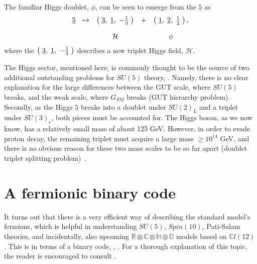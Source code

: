 \documentclass[letterpaper,12pt,titlepage,oneside,final]{book}
\newcommand{\C}{\mathbb{C}}
\newcommand{\RCHO}{\mathbb{R}\otimes\mathbb{C}\otimes\mathbb{H}\otimes\mathbb{O}}
\begin{document}
The familiar Higgs doublet, $\phi$, can be seen to emerge from the $\underline{5}$ as
\begin{equation}\begin{array}{rcccc}
\underline{5} & \mapsto & \left(\hspace{1mm} \underline{3}, \hspace{1mm}\underline{1}, \hspace{1mm}-\frac{1}{3} \hspace{1mm}\right) &+&\left(\hspace{1mm} \underline{1}, \hspace{1mm}\underline{2}, \hspace{1mm}\frac{1}{2} \hspace{1mm}\right), \vspace{4mm} \\

 &&\mathcal{H}&&\phi
\end{array}
\end{equation}
\noindent where the $\left(\hspace{1mm} \underline{3}, \hspace{1mm}\underline{1}, \hspace{1mm}-\frac{1}{3} \hspace{1mm}\right)$ describes a new triplet Higgs field, $\mathcal{H}$.  

The Higgs sector, mentioned here, is commonly thought to be the source of two additional outstanding problems for $SU(5)$ theory, \cite{Lang}.  Namely, there is no clear explanation for the large differences between the GUT scale, where $SU(5)$ breaks, and the weak scale, where $G_{SM}$ breaks (GUT hierarchy problem).  Secondly, as the Higgs $\underline{5}$ breaks into a doublet under $SU(2)_L$ and a triplet under $SU(3)_c$, both pieces must be accounted for.  The Higgs boson, as we now know, has a relatively small mass of about 125 GeV.  However, in order to evade proton decay, the remaining triplet must acquire a large mass $\geq 10^{14}$ GeV, and there is no obvious reason for these two mass scales to be so far apart (doublet triplet splitting problem)~\cite{Lang}.



\section{A fermionic binary code \label{binary}  }

It turns out that there is a very efficient way of describing the standard model's fermions, which is helpful in understanding $SU(5)$, $Spin(10)$, Pati-Salam theories, and incidentally, also upcoming $\RCHO$ models based on $\C l(12)$.   This is in terms of a binary code, \cite{agut}, \cite{Robinson}.  For a thorough explanation of this topic, the reader is encouraged to consult \cite{agut}.  
\end{document}
